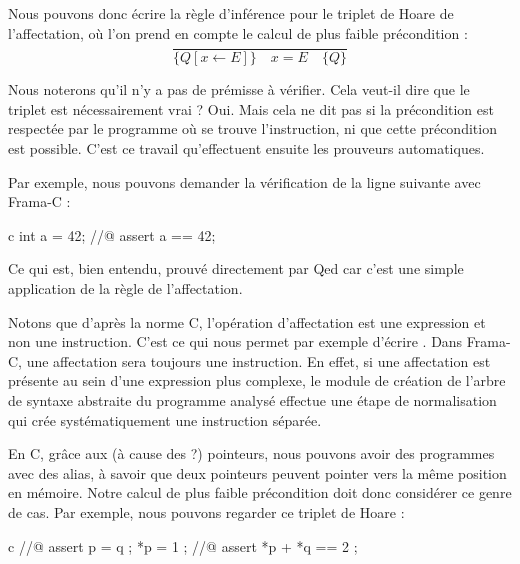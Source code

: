Nous pouvons donc écrire la règle d'inférence pour le triplet de Hoare de 
l'affectation, où l'on prend en compte le calcul de plus faible précondition :
$$\dfrac{}{\{Q[x \leftarrow E] \}\quad x = E \quad\{ Q \}}$$


Nous noterons qu'il n'y a pas de prémisse à vérifier. Cela veut-il dire que le
triplet est nécessairement vrai ? Oui. Mais cela ne dit pas si la précondition 
est respectée par le programme où se trouve l'instruction, ni que cette 
précondition est possible. C'est ce travail qu'effectuent ensuite les prouveurs
automatiques.



Par exemple, nous pouvons demander la vérification de la ligne suivante avec 
Frama-C :



\begin{CodeBlock}{c}
int a = 42;
//@ assert a == 42;
\end{CodeBlock}



Ce qui est, bien entendu, prouvé directement par Qed car c'est une simple 
application de la règle de l'affectation.



\begin{Information}
Notons que d'après la norme C, l'opération d'affectation est une expression
et non une instruction. C'est ce qui nous permet par exemple d'écrire 
. Dans Frama-C, une affectation sera toujours une
instruction. En effet, si une affectation est présente au sein d'une 
expression plus complexe, le module de création de l'arbre de syntaxe abstraite
du programme analysé effectue une étape de normalisation qui crée 
systématiquement une instruction séparée.
\end{Information}





En C, grâce aux (à cause des ?) pointeurs, nous pouvons avoir des programmes avec
des alias, à savoir que deux pointeurs peuvent pointer vers la même position en 
mémoire. Notre calcul de plus faible précondition doit donc considérer ce genre
de cas. Par exemple, nous pouvons regarder ce triplet de Hoare :


\begin{CodeBlock}{c}
//@ assert p = q ;
*p = 1 ;
//@ assert *p + *q == 2 ;
\end{CodeBlock}


